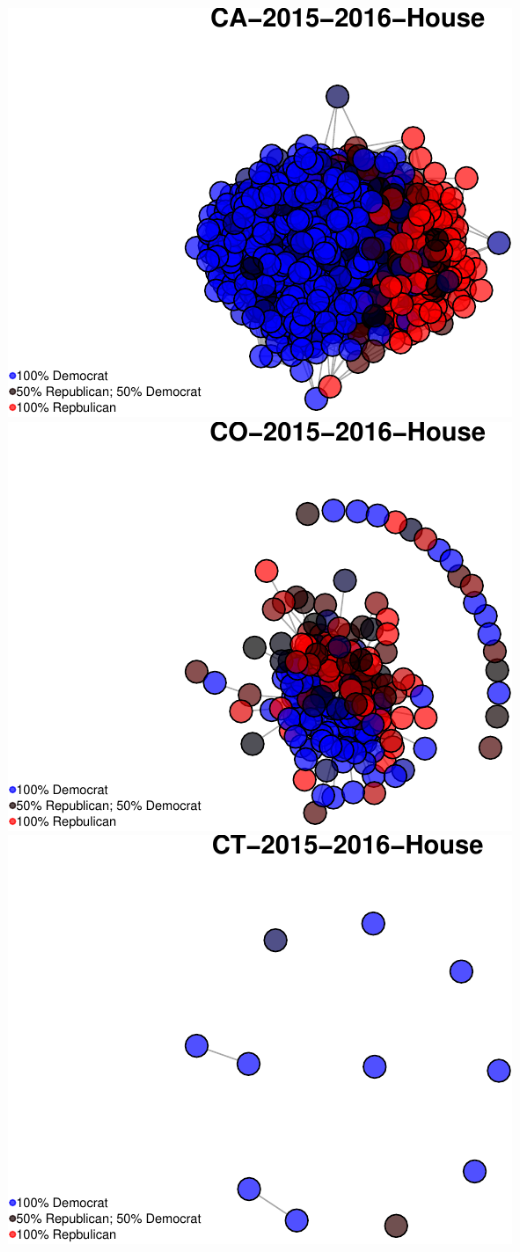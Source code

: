 \documentclass[]{article}
\begin{document}
\includegraphics{Final_Project_RMarkdown_Updated_files/figure-latex/unnamed-chunk-10-4.pdf}
\includegraphics{Final_Project_RMarkdown_Updated_files/figure-latex/unnamed-chunk-10-5.pdf}
\includegraphics{Final_Project_RMarkdown_Updated_files/figure-latex/unnamed-chunk-10-6.pdf}
\end{document}
